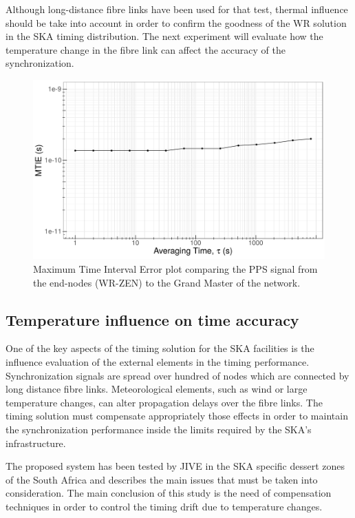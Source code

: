 Although long-distance fibre links have been used for that test, thermal 
influence should be take into account in order to confirm the goodness of the 
WR solution in the SKA timing distribution. The next experiment will evaluate 
how the temperature change in the fibre link can affect the accuracy of the 
synchronization. 

\begin{figure}
	\centering
	\includegraphics[width=0.5\linewidth]{img/MTIE_exp3}
	\caption[MTIE of the end-nodes in the scalability test.]{Maximum Time 
	Interval Error
	plot comparing the PPS signal from the end-nodes (WR-ZEN) to the Grand 
	Master of the network.}
	\label{fig:mtienet}
\end{figure}

\subsection{Temperature influence on time accuracy}
\label{subsec:temp}

One of the key aspects of the timing solution for the SKA facilities is the 
influence evaluation of the external elements in the timing performance. 
Synchronization signals are spread over hundred of nodes which are connected by 
long distance fibre links. Meteorological elements, such as wind or large 
temperature changes, can alter propagation delays over the fibre 
links. The timing solution must compensate appropriately those effects in order 
to maintain the synchronization performance inside the limits required by the 
SKA's infrastructure. 

The proposed system has been tested by JIVE in the SKA specific dessert zones of 
the South Africa and \cite{paul-boven-paper-icalepcs} describes the main issues 
that must be taken into consideration. The main conclusion of this study is the
need of compensation techniques in order to control the timing drift due to
temperature changes.


